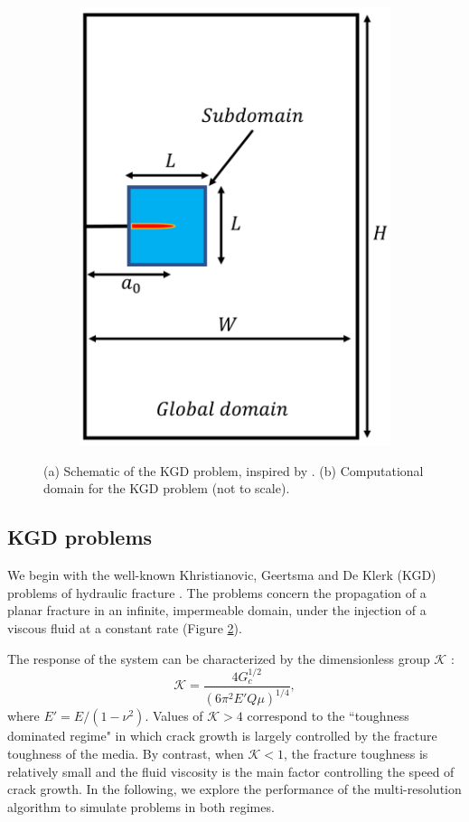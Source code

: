 \begin{figure}[!htbp]
\begin{subfigure}{.5\textwidth}
  \includegraphics[width=.62\linewidth]{img/toughness_prob/KGD_schematic_2.png}
  \caption{}
  \label{fig:2D_schematics_kgd}
\end{subfigure}
\caption{(a) Schematic of the KGD problem, inspired by \cite{adachi2007computer}. (b) Computational domain for the KGD problem (not to scale).}
  \label{fig:kgd_schematics}
\end{figure}

\subsection{KGD problems} 
We begin with the well-known Khristianovic, Geertsma and De Klerk (KGD) problems of hydraulic fracture \cite{geertsma1969rapid, zheltov19553}.  The problems concern the propagation of a planar fracture in an infinite, impermeable domain, under the injection of a viscous fluid at a constant rate (Figure \ref{fig:kgd_schematics}). 

The response of the system can be characterized by the dimensionless group $\mathcal{K}$ \cite{detournay2016mechanics}:
\begin{equation}\label{KGD_group}
    \mathcal{K} = \dfrac{4G^{1/2}_{c}}{(6\pi^2E'Q\mu)^{1/4}},
\end{equation}
where $E' = E/(1-\nu^2)$. Values of $\mathcal{K} > 4$ correspond to the ``toughness dominated regime" in which crack growth is largely controlled by the fracture toughness of the media.  By contrast, when  $\mathcal{K} < 1$, the fracture toughness is relatively small and the fluid viscosity is the main factor controlling the speed of crack growth.  In the following, we explore the performance of the multi-resolution algorithm to simulate problems in both regimes.  

